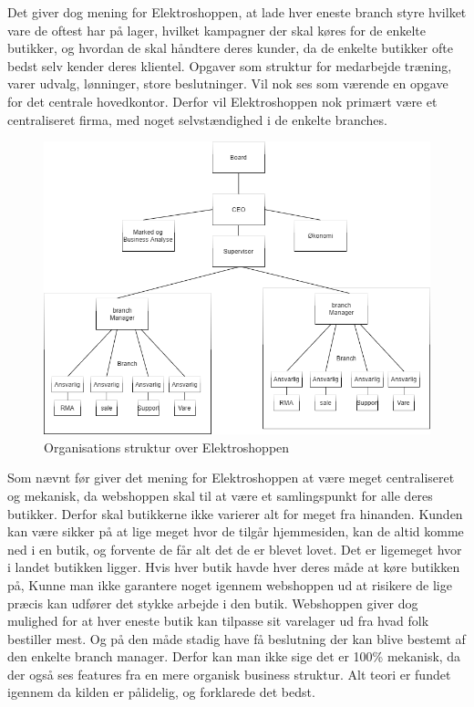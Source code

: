 Det giver dog mening for Elektroshoppen, at lade hver eneste branch styre hvilket vare de oftest har på lager, hvilket kampagner der skal køres for de enkelte butikker, og hvordan de skal håndtere deres kunder, da de enkelte butikker ofte bedst selv kender deres klientel. Opgaver som struktur for medarbejde træning, varer udvalg, lønninger, store beslutninger. Vil nok ses som værende en opgave for det centrale hovedkontor. Derfor vil Elektroshoppen nok primært være et centraliseret firma, med noget selvstændighed i de enkelte branches.

\begin{figure}[H]
	\includegraphics[width=\linewidth]{elaborationsdokumentet/figurer/Organisation.png}
    \caption{Organisations struktur over Elektroshoppen}
    \label{struktur}
\end{figure}
 
Som nævnt før giver det mening for Elektroshoppen at være meget centraliseret og mekanisk, da webshoppen skal til at være et samlingspunkt for alle deres butikker. Derfor skal butikkerne ikke varierer alt for meget fra hinanden. Kunden kan være sikker på at lige meget hvor de tilgår hjemmesiden, kan de altid komme ned i en butik, og forvente de får alt det de er blevet lovet. Det er ligemeget hvor i landet butikken ligger. Hvis hver butik havde hver deres måde at køre butikken på, Kunne man ikke garantere noget igennem webshoppen ud at risikere de lige præcis kan udfører det stykke arbejde i den butik.  Webshoppen giver dog mulighed for at hver eneste butik kan tilpasse sit varelager ud fra hvad folk bestiller mest. Og på den måde stadig have få beslutning der kan blive bestemt af den enkelte branch manager. Derfor kan man ikke sige det er 100\% mekanisk, da der også ses features fra en mere organisk business struktur. Alt teori er fundet igennem \cite{organisation} da kilden er pålidelig, og forklarede det bedst.

